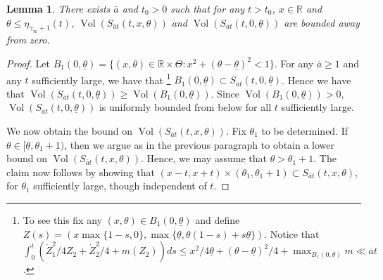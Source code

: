 \documentclass[11pt]{article}    %
\newtheorem{lemma}[theorem]{Lemma}
\newcommand{\R}{\mathbb{R}}
\DeclareMathOperator{\Vol}{Vol}
\begin{document}
\begin{lemma}\label{lem:volume}
There exists $\bar a$ and $t_0 > 0$ such that for any $t>t_0$, $x\in\R$ and $\theta \leq \eta_{\gamma_\infty+1}(t)$, $
\Vol(S_{\bar a t}(t,x,\theta))$ and $\Vol(S_{\bar a t}(t, 0,\underline\theta))$
are bounded away from zero.
\end{lemma}

\begin{proof}%
Let $B_1(0,\underline \theta) = \{(x,\theta) \in \R\times\Theta: x^2 + (\theta-\underline\theta)^2 < 1\}$.  For any $\overline a \geq 1$ and any $t$ sufficiently large, we have that%
%
%
\footnote{To see this fix any $(x,\theta) \in B_1(0,\underline\theta)$ and define $Z(s) = (x\max\{1-s,0\}, \max\{\underline\theta, \theta(1-s) + s\underline\theta\})$.  Notice that $\int_0^t (\dot Z_1^2/4Z_2 + \dot Z_2^2/4 + m(Z_2)) ds \leq x^2/4\underline \theta + (\theta-\underline\theta)^2/4 + \max_{B_1(0,\underline\theta)}m \ll \overline a t$.}
%
 $B_1(0,\underline \theta) \subset S_{\bar a t} (t,0,\underline \theta)$.  Hence we have that $\Vol(S_{\bar a t}(t,0,\underline \theta)) \geq \Vol(B_1(0,\underline \theta))$. Since $\Vol(B_1(0,\underline \theta)) > 0$, $\Vol(S_{\bar a t}(t,0,\underline\theta))$ is uniformly bounded from below for all $t$ sufficiently large.%


  


We now obtain the bound on $\Vol(S_{\bar a t}(t,x,\theta))$.  Fix $\theta_1$ to be determined.  If $\theta \in [\underline\theta, \theta_1 + 1)$, then we argue as in the previous paragraph to obtain a lower bound on $\Vol(S_{\bar a t}(t,x,\theta))$.  Hence, we may assume that $\theta > \theta_1+1$.  The claim now follows by showing that $(x-t,x+t)\times (\theta_1,\theta_1+1) \subset S_{\bar a t}(t,x,\theta)$, for $\theta_1$ sufficiently large, though independent of $t$.


\end{proof}
\end{document}
